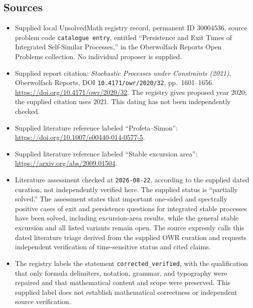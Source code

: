 \documentclass[11pt]{article}
\begin{document}
\subsection{Sources}
\begin{itemize}
\item Supplied local UnsolvedMath registry record, permanent ID \(30004536\), source problem code \texttt{catalogue entry}, entitled ``Persistence and Exit Times of Integrated Self-Similar Processes,'' in the Oberwolfach Reports Open Problems collection. No individual proposer is supplied.
\item Supplied report citation: \emph{Stochastic Processes under Constraints (2021)}, Oberwolfach Reports, DOI \texttt{10.4171/owr/2020/32}, pp.\ 1601--1656. \url{https://doi.org/10.4171/owr/2020/32}. The registry gives proposed year \(2020\); the supplied citation uses \(2021\). This dating has not been independently checked.
\item Supplied literature reference labeled ``Profeta--Simon'': \url{https://doi.org/10.1007/s00440-014-0577-5}.
\item Supplied literature reference labeled ``Stable excursion area'': \url{https://arxiv.org/abs/2009.01504}.
\item Literature assessment checked at \texttt{2026-08-22}, according to the supplied dated curation, not independently verified here. The supplied status is ``partially solved.'' The assessment states that important one-sided and spectrally positive cases of exit and persistence questions for integrated stable processes have been solved, including excursion-area results, while the general stable excursion and all listed variants remain open. The source expressly calls this dated literature triage derived from the supplied OWR curation and requests independent verification of time-sensitive status and cited claims.
\item The registry labels the statement \texttt{corrected\_verified}, with the qualification that only formula delimiters, notation, grammar, and typography were repaired and that mathematical content and scope were preserved. This supplied label does not establish mathematical correctness or independent source verification.
\end{itemize}
\end{document}
